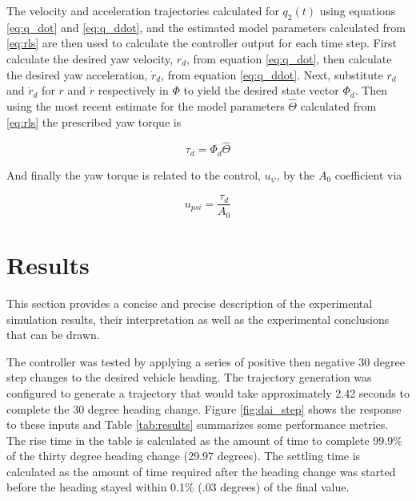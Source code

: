 \documentclass[applsci,article,submit,pdftex,moreauthors]{Definitions/mdpi}
\begin{document}
\begin{paracol}{2}
The velocity and acceleration trajectories calculated for $q_2(t)$ using equations \eqref{eq:q_dot} and \eqref{eq:q_ddot}, and the estimated model parameters calculated from \eqref{eq:rls} are then used to calculate the controller output for each time step. First calculate the desired yaw velocity, $r_d$, from equation \eqref{eq:q_dot}, then calculate the desired yaw acceleration, $\dot{r}_d$, from equation \eqref{eq:q_ddot}. Next, substitute $r_d$ and $\dot{r}_d$ for $r$ and $\dot{r}$ respectively in $\Phi$ to yield the desired state vector $\Phi_d$. Then using the most recent estimate for the model parameters $\hat{\Theta}$ calculated from \eqref{eq:rls} the prescribed yaw torque is
\begin{linenomath}
\begin{equation}
  \label{eq:ctrl_output}
  \tau_d = \Phi_d\hat{\Theta}  
\end{equation}
\end{linenomath}
And finally the yaw torque is related to the control, $u_\psi$, by the $A_0$ coefficient via
\begin{linenomath}
\begin{equation}
  u_{psi} = \frac{\tau_d}{A_0} 
\end{equation}
\end{linenomath} 

\section{Results}

This section provides a concise and precise description of the experimental simulation results, their interpretation as well as the experimental conclusions that can be drawn.

The controller was tested by applying a series of positive then negative 30 degree step changes to the desired vehicle heading. The trajectory generation was configured to generate a trajectory that would take approximately 2.42 seconds to complete the 30 degree heading change. Figure \ref{fig:dai_step} shows the response to these inputs and Table \ref{tab:results} summarizes some performance metrics. The rise time in the table is calculated as the amount of time to complete 99.9\% of the thirty degree heading change (29.97 degrees). The settling time is calculated as the amount of time required after the heading change was started before the heading stayed within 0.1\% (.03 degrees) of the final value.


\end{paracol}
\end{document}
